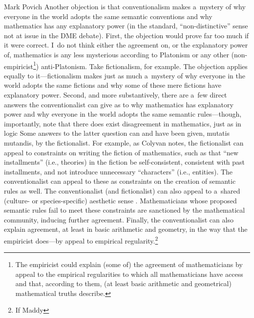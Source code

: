 \begin{artengenv}{Mark Povich}
{Another objection is that conventionalism makes a~mystery of why everyone in the world adopts the same semantic conventions and why mathematics has any explanatory power (in the standard, ``non-distinctive'' sense not at issue in the DME debate). First, the objection would prove far too much if it were correct. I~do not think either the agreement on, or the explanatory power of, mathematics is any less mysterious according to Platonism or any other (non-empiricist\footnote{The empiricist could explain (some of) the agreement of mathematicians by appeal to the empirical regularities to which all mathematicians have access and that, according to them, (at least basic arithmetic and geometrical) mathematical truths describe.}) anti-Platonism. Take fictionalism, for example. The objection applies equally to it---fictionalism makes just as much a~mystery of why everyone in the world adopts the same fictions and why some of these mere fictions have explanatory power. Second, and more substantively, there are a~few direct answers the conventionalist can give as to why mathematics has explanatory power and why everyone in the world adopts the same semantic rules---though, importantly, note that there does exist disagreement in mathematics, just as in logic
 Some answers to the latter question can and have been given, mutatis mutandis, by the fictionalist. For example, as Colyvan 
\parencite*[][]{colyvan_fictionalism_2011} %
 notes, the fictionalist can appeal to constraints on writing the fiction of mathematics, such as that ``new installments'' (i.e., theories) in the fiction be self-consistent, consistent with past installments, and not introduce unnecessary ``characters'' (i.e., entities). The conventionalist can appeal to these as constraints on the creation of semantic rules as well. The conventionalist (and fictionalist) can also appeal to a~shared (culture- or species-specific) aesthetic sense 
\parencite[see][]{steiner_applicability_1998}. %
 Mathematicians whose proposed semantic rules fail to meet these constraints are sanctioned by the mathematical community, inducing further agreement. Finally, the conventionalist can also explain agreement, at least in basic arithmetic and geometry, in the way that the empiricist does---by appeal to empirical regularity.\footnote{If Maddy 
}}
\end{artengenv}
